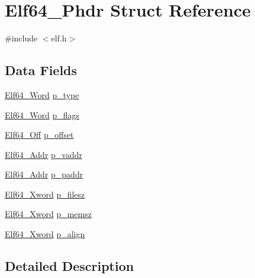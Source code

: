 \hypertarget{struct_elf64___phdr}{\section{Elf64\-\_\-\-Phdr Struct Reference}
\label{struct_elf64___phdr}
}


{\ttfamily \#include $<$elf.\-h$>$}

\subsection*{Data Fields}
\begin{DoxyCompactItemize}
\item 
\hyperlink{elf_8h_aa3aa1920ed115b7ef7e99716fece4401}{Elf64\-\_\-\-Word} \hyperlink{struct_elf64___phdr_ab6106ae91030bd680b061563ad353fb9}{p\-\_\-type}
\item 
\hyperlink{elf_8h_aa3aa1920ed115b7ef7e99716fece4401}{Elf64\-\_\-\-Word} \hyperlink{struct_elf64___phdr_a2c6d96dc1a597b942fc2dc7ad5c2251d}{p\-\_\-flags}
\item 
\hyperlink{elf_8h_a6f7837bc80df7a68291fce54ff088849}{Elf64\-\_\-\-Off} \hyperlink{struct_elf64___phdr_abb9049b9d526ef0716fa3903c955bf39}{p\-\_\-offset}
\item 
\hyperlink{elf_8h_aeed51d08e3a950d637f8ec1f0cd4ef65}{Elf64\-\_\-\-Addr} \hyperlink{struct_elf64___phdr_a00f29181ec51d2d8e1b7470eebb6c3cd}{p\-\_\-vaddr}
\item 
\hyperlink{elf_8h_aeed51d08e3a950d637f8ec1f0cd4ef65}{Elf64\-\_\-\-Addr} \hyperlink{struct_elf64___phdr_a8f86f534551eda502922e462842a105f}{p\-\_\-paddr}
\item 
\hyperlink{elf_8h_a5447a48a3dae0bd24f606415268c6fe4}{Elf64\-\_\-\-Xword} \hyperlink{struct_elf64___phdr_ae9d6a504ec878bf7493f6b6f858d3107}{p\-\_\-filesz}
\item 
\hyperlink{elf_8h_a5447a48a3dae0bd24f606415268c6fe4}{Elf64\-\_\-\-Xword} \hyperlink{struct_elf64___phdr_a0e0391286a8c7d60a30acdfe4ba66afa}{p\-\_\-memsz}
\item 
\hyperlink{elf_8h_a5447a48a3dae0bd24f606415268c6fe4}{Elf64\-\_\-\-Xword} \hyperlink{struct_elf64___phdr_a306c8ed70f923f594559202b1c741914}{p\-\_\-align}
\end{DoxyCompactItemize}


\subsection{Detailed Description}


